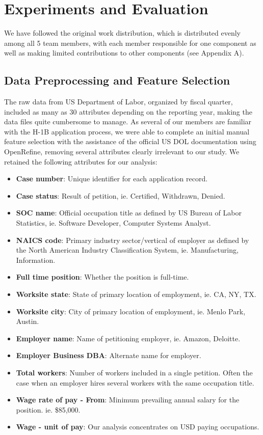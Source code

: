\documentclass[sigconf]{acmart}
\begin{document}
\section{Experiments and Evaluation}

We have followed the original work distribution, which is distributed evenly among all 5 team members, 
with each member responsible for one component as well as making limited contributions to other components (see Appendix A). 


\subsection{Data Preprocessing and Feature Selection}

The raw data from US Department of Labor, organized by fiscal quarter, 
included as many as 30 attributes depending on the reporting year, 
making the data files quite cumbersome to manage. 
As several of our members are familiar with the H-1B application process, 
we were able to complete an initial manual feature selection with the assistance 
of the official US DOL documentation using OpenRefine, 
removing several attributes clearly irrelevant to our study. 
We retained the following attributes for our analysis:

  \begin{itemize}
    
  \item \textbf{Case number}: Unique identifier for each application record.
  \item \textbf{Case status}: Result of petition, 
  ie. Certified, Withdrawn, Denied. 
  \item \textbf{SOC name}: Official occupation title as defined by US Bureau of Labor Statistics, 
  ie. Software Developer, Computer Systems Analyst.
  \item \textbf{NAICS code}: Primary industry sector/vertical of employer as defined by 
  the North American Industry Classification System, 
  ie. Manufacturing, Information.
  \item \textbf{Full time position}: Whether the position is full-time.
  \item \textbf{Worksite state}: State of primary location of employment,
  ie. CA, NY, TX.
  \item \textbf{Worksite city}: City of primary location of employment, 
  ie. Menlo Park, Austin.
  \item \textbf{Employer name}: Name of petitioning employer,
  ie. Amazon, Deloitte.
  \item \textbf{Employer Business DBA}: Alternate name for employer. 
  \item \textbf{Total workers}: Number of workers included in a single petition. 
  Often the case when an employer hires several workers with the same occupation title. 
  \item \textbf{Wage rate of pay - From}: Minimum prevailing annual salary for the position.
  ie. \$85,000.
  \item \textbf{Wage - unit of pay}: Our analysis concentrates on USD paying occupations.

  \end{itemize}
\end{document}
